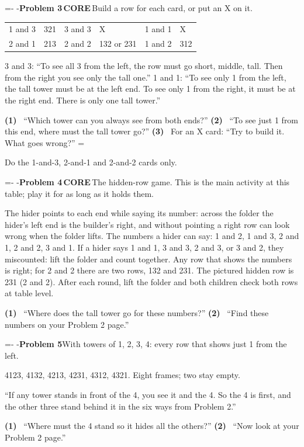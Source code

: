 \documentclass[11pt]{extarticle}
\makeatletter
\newcommand{\needlines}[1]{\par\penalty0\begingroup
  \dimen@=#1\relax\dimen@ii=\pagegoal\advance\dimen@ii-\pagetotal
  \ifdim\dimen@>\dimen@ii\ifdim\dimen@ii>\z@\vfil\fi\penalty-\@M\fi\endgroup}
\newcommand{\lastitem}{\@itempenalty=\@M\item}
\newcommand{\core}{\colorbox{accent}{\color{white}\footnotesize\bfseries\,CORE\,}}
\newcommand{\further}{\fcolorbox{accent}{white}{\color{accent}\footnotesize\bfseries\,FURTHER\,}}
\newcommand{\pb}[3]{\par\needlines{4\baselineskip}\addvspace{5pt}\noindent\textbf{Problem #1}\enspace#2\enspace #3\par\nopagebreak[4]}
\newcommand{\hint}[1]{\textbf{(#1)}~}
\makeatother
\begin{document}
\pb{3}{\core}{Build a row for each card, or put an X on it.}
\begin{pbody}
\item[Answer] \begin{tabular}[t]{@{}l l@{\qquad}l l@{\qquad}l l@{}}
1 and 3 & 321 & 3 and 3 & X & 1 and 1 & X \\
2 and 1 & 213 & 2 and 2 & 132 or 231 & 1 and 2 & 312 \\
\end{tabular}
\item[Why X] 3 and 3: ``To see all 3 from the left, the row must go short, middle, tall. Then from the right you see only the tall one.'' 1 and 1: ``To see only 1 from the left, the tall tower must be at the left end. To see only 1 from the right, it must be at the right end. There is only one tall tower.''
\item[Hints] \hint1 ``Which tower can you always see from both ends?'' \hint2 ``To see just 1 from this end, where must the tall tower go?'' \hint3 For an X card: ``Try to build it. What goes wrong?''
\lastitem[If stuck] Do the 1-and-3, 2-and-1 and 2-and-2 cards only.
\end{pbody}

\pb{4}{\core}{The hidden-row game. This is the main activity at this table; play it for as long as it holds them.}
\begin{pbody}
\item[Answer] The hider points to each end while saying its number: across the folder the hider's left end is the builder's right, and without pointing a right row can look wrong when the folder lifts. The numbers a hider can say: 1 and 2, 1 and 3, 2 and 1, 2 and 2, 3 and 1. If a hider says 1 and 1, 3 and 3, 2 and 3, or 3 and 2, they miscounted: lift the folder and count together. Any row that shows the numbers is right; for 2 and 2 there are two rows, 132 and 231. The pictured hidden row is 231 (2 and 2). After each round, lift the folder and both children check both rows at table level.
\item[Hints] \hint1 ``Where does the tall tower go for these numbers?'' \hint2 ``Find these numbers on your Problem 2 page.''
\end{pbody}

\pb{5}{\further}{With towers of 1, 2, 3, 4: every row that shows just 1 from the left.}
\begin{pbody}
\item[Answer] 4123, 4132, 4213, 4231, 4312, 4321. Eight frames; two stay empty.
\item[Why all] ``If any tower stands in front of the 4, you see it and the 4. So the 4 is first, and the other three stand behind it in the six ways from Problem 2.''
\item[Hints] \hint1 ``Where must the 4 stand so it hides all the others?'' \hint2 ``Now look at your Problem 2 page.''
\end{pbody}
\end{document}
